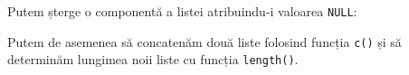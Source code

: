 \documentclass[]{article}
\newenvironment{Shaded}{\begin{snugshade}}{\end{snugshade}}
\newcommand{\DecValTok}[1]{\textcolor[rgb]{0.00,0.00,0.81}{#1}}
\newcommand{\NormalTok}[1]{#1}
\newcommand{\OperatorTok}[1]{\textcolor[rgb]{0.81,0.36,0.00}{\textbf{#1}}}
\newcommand{\OtherTok}[1]{\textcolor[rgb]{0.56,0.35,0.01}{#1}}
\newcommand{\StringTok}[1]{\textcolor[rgb]{0.31,0.60,0.02}{#1}}
\begin{document}
Putem șterge o componentă a listei atribuindu-i valoarea \texttt{NULL}:

\begin{Shaded}
\end{Shaded}

Putem de asemenea să concatenăm două liste folosind funcția \texttt{c()}
și să determinăm lungimea noii liste cu funcția \texttt{length()}.
\end{document}
